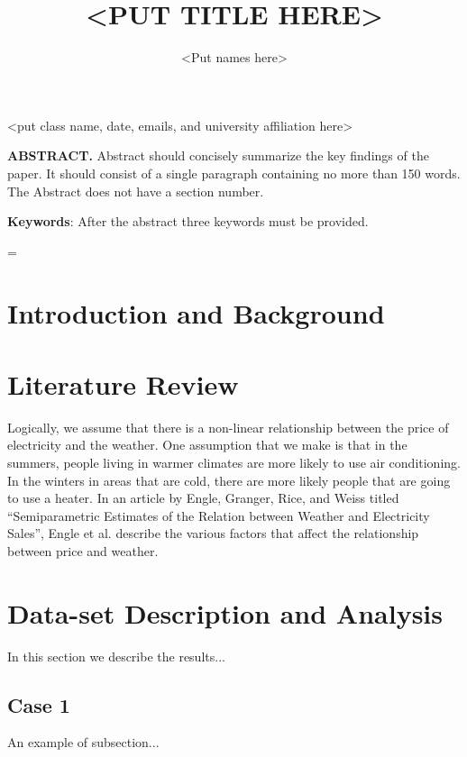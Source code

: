 \documentclass[10pt]{article}
\title{\renewcommand{\baselinestretch}{1.17}\normalsize\bf%
\uppercase{<Put Title Here>}
}
\author{
<Put names here>
}
\begin{document}
\date{}

\maketitle

\vspace{-0.5cm}

\begin{center}
{\footnotesize 
<put class name, date, emails, and university affiliation here>
}
\end{center}
\bigskip
\noindent
{\small{\bf ABSTRACT.}
Abstract should concisely
summarize the key findings of the paper. It should consist 
of a single paragraph containing no more than 150 words. 
The Abstract does not have a section number.
}

\medskip
\noindent
{\small{\bf Keywords}{:} 
After the abstract three keywords must be provided.
}

\baselineskip=\normalbaselineskip

\section{Introduction and Background}\label{sec:1}

\section{Literature Review}\label{sec:2}
Logically, we assume that there is a non-linear relationship between the price of electricity and the weather. One assumption that we make is that in the summers, people living in warmer climates are more likely to use air conditioning. In the winters in areas that are cold, there are more likely people that are going to use a heater. In an article by Engle, Granger, Rice, and Weiss titled “Semiparametric Estimates of the Relation between Weather and Electricity Sales”, Engle et al. describe the various factors that affect the relationship between price and weather. 

\section{Data-set Description and Analysis}\label{sec:3}
In this section we describe the results...

\subsection{Case 1}
An example of subsection...
\end{document}
